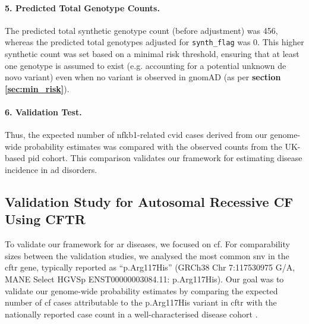 \paragraph{5. Predicted Total Genotype Counts.}
The predicted total synthetic genotype count (before adjustment) was 456, whereas the predicted total genotypes adjusted for \texttt{synth\_flag} was 0. This higher synthetic count was set based on a minimal risk threshold, ensuring that at least one genotype is assumed to exist (e.g. accounting for a potential unknown de novo variant) even when no variant is observed in gnomAD (as per \textbf{section
\ref{sec:min_risk}}).

\paragraph{6. Validation Test.}
Thus, the expected number of \ac{nfkb1}-related \ac{cvid} cases derived from our genome-wide probability estimates was compared with the observed counts from the UK-based \ac{pid} cohort. This comparison validates our framework for estimating disease incidence in \ac{ad} disorders.


\subsection{Validation Study for Autosomal Recessive CF Using CFTR}

To validate our framework for \ac{ar} diseases, we focused on \ac{cf}.
For comparability sizes between the validation studies, we analysed the most common \ac{snv} in the \ac{cftr} gene, typically reported as ``p.Arg117His'' (GRCh38 Chr 7:117530975 G/A, MANE Select HGVSp ENST00000003084.11: p.Arg117His).
Our goal was to validate our genome-wide probability estimates by comparing the expected number of \ac{cf} cases attributable to the p.Arg117His variant in \ac{cftr} with the nationally reported case count in a well-characterised disease cohort
\cite{naito2023uk, castellani2013cftr2, Grasemann2023cftr}.

